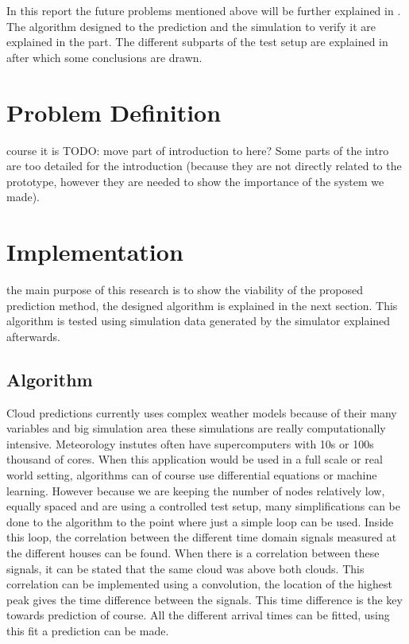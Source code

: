 \documentclass[a4paper,journal]{DDREAM}
\begin{document}
In this report the future problems mentioned above will be further explained in .
The algorithm designed to the prediction and the simulation to verify it are explained in the  part.
The different subparts of the test setup are explained in  after which some conclusions are drawn.

\section{Problem Definition}\label{sec:problem_definition}
 course it is 
TODO: move part of introduction to here?
Some parts of the intro are too detailed for the introduction (because they are not directly related to the prototype, however they are needed to show the importance of the system we made).

\clearpage

\section{Implementation}\label{sec:implementation}
 the main purpose of this research is to show the viability of the proposed prediction method, the designed algorithm is explained in the next section.
This algorithm is tested using simulation data generated by the simulator explained afterwards.

\subsection{Algorithm}\label{sec:implementation-algorithm}
Cloud predictions currently uses complex weather models because of their many variables and big simulation area these simulations are really computationally intensive.
Meteorology instutes often have supercomputers with 10s or 100s thousand of cores.
When this application would be used in a full scale or real world setting, algorithms can of course use differential equations or machine learning.
However because we are keeping the number of nodes relatively low, equally spaced and are using a controlled test setup, many simplifications can be done to the algorithm to the point where just a simple loop can be used.
Inside this loop, the correlation between the different time domain signals measured at the different houses can be found.
When there is a correlation between these signals, it can be stated that the same cloud was above both clouds.
This correlation can be implemented using a convolution, the location of the highest peak gives the time difference between the signals.
This time difference is the key towards prediction of course.
All the different arrival times can be fitted, using this fit a prediction can be made.
\end{document}
